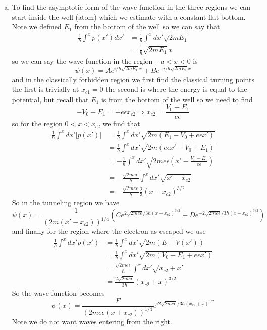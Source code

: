 \documentclass[11pt]{article}
\numberwithin{equation}{section}
\begin{document}
\begin{enumerate}[(a)]
\item
To find the asymptotic form of the wave function in the three regions we can start inside the well (atom) which we estimate with a constant flat bottom. Note we defined $E_1$ from the bottom of the well so we can say that
\begin{align*}
\frac{1}{\hbar}\int^{x}p(x')dx' &= \frac{1}{\hbar}\int^{x}dx'\sqrt{2mE_1} \\ 
&= \frac{1}{\hbar}\sqrt{2mE_1}x 
\end{align*}
so we can say the wave function in the region $-a<x<0$ is
$$\psi(x) = Ae^{i/\hbar\sqrt{2mE_1}x} + Be^{-i/\hbar\sqrt{2mE_1}x}$$
and in the classically forbidden region we first find the classical turning points the first is trivially at $x_{c1} = 0$ the second is where the energy is equal to the potential, but recall that $E_1$ is from the bottom of the well so we need to find 
$$-V_0 + E_1 = -e\epsilon x_{c2} \Rightarrow x_{c2} = \frac{V_0 - E_1}{e\epsilon}$$
so for the region $0<x<x_{c2}$ we find that 
\begin{align*}
\frac{1}{\hbar}\int^{x}dx'|p(x')| &= \frac{1}{\hbar}\int^{x}dx'\sqrt{2m(E_1-V_0+e\epsilon x')} \\ 
&= \frac{1}{\hbar}\int^{x}dx'\sqrt{2m(e\epsilon x' - V_0 + E_1)} \\ 
&= -\frac{1}{\hbar}\int^{x}dx'\sqrt{2me\epsilon\left(x' - \frac{V_0 - E_1}{e\epsilon}\right)} \\ 
&= -\frac{\sqrt{2me\epsilon}}{\hbar}\int^{x}dx'\sqrt{x' - x_{c2}}\\
&= -\frac{\sqrt{2me\epsilon}}{\hbar}\frac{2}{3}(x - x_{c2})^{3/2}
\end{align*}
So in the tunneling region we have
$$\psi(x) = \frac{1}{(2m(x'-x_{c2}))^{1/4}}\left(Ce^{2\sqrt{2me\epsilon}/3\hbar(x - x_{c2})^{3/2}} + De^{-2\sqrt{2me\epsilon}/3\hbar(x - x_{c2})^{3/2}}\right)$$
and finally for the region where the electron as escaped we use 
\begin{align*}
\frac{1}{\hbar}\int^xdx'p(x') &= \frac{1}{\hbar}\int^xdx'\sqrt{2m(E-V(x'))} \\
&= \frac{1}{\hbar}\int^xdx'\sqrt{2m(V_0-E_1+e\epsilon x')} \\
&= \frac{\sqrt{2me\epsilon}}{\hbar}\int^xdx'\sqrt{x_{c2} + x'} \\
&= \frac{2\sqrt{2me\epsilon}}{3\hbar}(x_{c2} + x)^{3/2}
\end{align*}
So the wave function becomes
$$\psi(x) = \frac{F}{(2me\epsilon(x+x_{c2}))^{1/4}}e^{i2\sqrt{2me\epsilon}/3\hbar(x_{c2} + x)^{3/2}}$$
Note we do not want waves entering from the right.


\end{enumerate}
\end{document}
